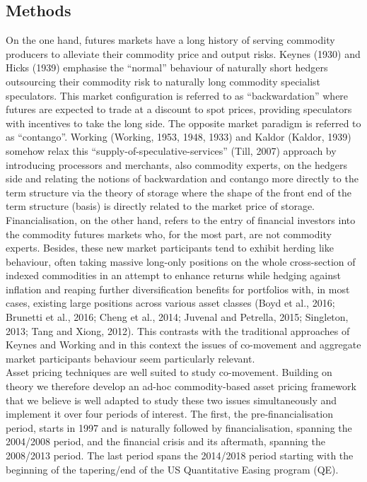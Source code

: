 \documentclass[]{elsarticle} %
\begin{document}
\hypertarget{co-movement-methods}{%
\subsection{Methods}\label{co-movement-methods}}

On the one hand, futures markets have a long history of serving commodity producers to alleviate their commodity price and output risks. Keynes (1930) and Hicks (1939) emphasise the ``normal'' behaviour of naturally short hedgers outsourcing their commodity risk to naturally long commodity specialist speculators. This market configuration is referred to as ``backwardation'' where futures are expected to trade at a discount to spot prices, providing speculators with incentives to take the long side. The opposite market paradigm is referred to as ``contango''. Working (Working, 1953, 1948, 1933) and Kaldor (Kaldor, 1939) somehow relax this ``supply-of-speculative-services'' (Till, 2007) approach by introducing processors and merchants, also commodity experts, on the hedgers side and relating the notions of backwardation and contango more directly to the term structure via the theory of storage where the shape of the front end of the term structure (basis) is directly related to the market price of storage.\\
Financialisation, on the other hand, refers to the entry of financial investors into the commodity futures markets who, for the most part, are not commodity experts. Besides, these new market participants tend to exhibit herding like behaviour, often taking massive long-only positions on the whole cross-section of indexed commodities in an attempt to enhance returns while hedging against inflation and reaping further diversification benefits for portfolios with, in most cases, existing large positions across various asset classes (Boyd et al., 2016; Brunetti et al., 2016; Cheng et al., 2014; Juvenal and Petrella, 2015; Singleton, 2013; Tang and Xiong, 2012). This contrasts with the traditional approaches of Keynes and Working and in this context the issues of co-movement and aggregate market participants behaviour seem particularly relevant.\\
Asset pricing techniques are well suited to study co-movement. Building on theory we therefore develop an ad-hoc commodity-based asset pricing framework that we believe is well adapted to study these two issues simultaneously and implement it over four periods of interest. The first, the pre-financialisation period, starts in 1997 and is naturally followed by financialisation, spanning the 2004/2008 period, and the financial crisis and its aftermath, spanning the 2008/2013 period. The last period spans the 2014/2018 period starting with the beginning of the tapering/end of the US Quantitative Easing program (QE).\\
\end{document}
